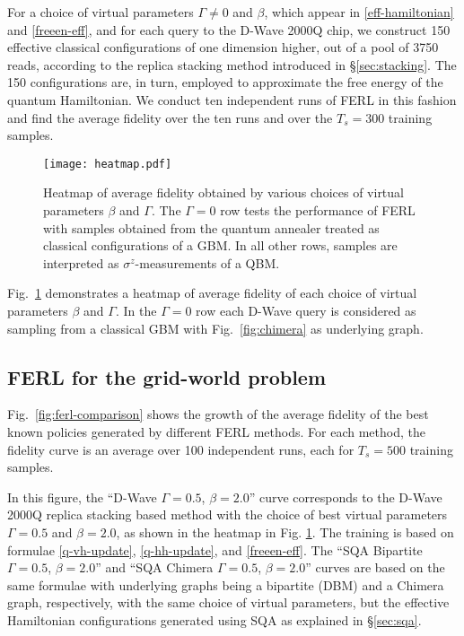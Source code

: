 \documentclass[pra,twocolumn,floatfix,superscriptaddress]{revtex4}
\begin{document}
For a choice of virtual parameters $\Gamma \neq 0$ and $\beta$, which appear in \eqref{eff-hamiltonian} and \eqref{freeen-eff}, and for each query to the D-Wave 2000Q chip, we construct 150 effective classical configurations of one dimension higher, out of a pool of 3750 reads, according to the replica stacking method introduced in \S\ref{sec:stacking}. The 150 configurations are, in turn, employed to approximate the free energy of the quantum Hamiltonian. 
We conduct ten independent runs of FERL in this fashion and find the average fidelity over the ten runs and over the $T_s= 300$ training samples. 
\begin{figure}
  \centering
     \texttt{[image: heatmap.pdf]}  
     \caption{\footnotesize{Heatmap of average fidelity obtained by various choices of virtual parameters $\beta$ and $\Gamma$. The $\Gamma = 0$ row tests the performance of FERL with samples obtained from the quantum annealer treated as classical configurations of a GBM. In all other rows, samples are interpreted as $\sigma^z$-measurements of a QBM.}}
  \label{fig:heatmap}
\end{figure}


Fig.~\ref{fig:heatmap} demonstrates a heatmap of average fidelity of each choice of virtual parameters $\beta$ and $\Gamma$. In the $\Gamma = 0$ row each D-Wave query is considered as sampling from a classical GBM with Fig.~\ref{fig:chimera} as underlying graph. 

\subsection{FERL for the grid-world problem} 

Fig.~\ref{fig:ferl-comparison} shows the growth of the average fidelity of the best known policies generated by different FERL methods. For each method, the fidelity curve is an average over 100 independent runs, each for $T_s= 500$ training samples. 

In this figure, the ``D-Wave $\Gamma = 0.5$, $\beta = 2.0$'' curve corresponds to the D-Wave 2000Q replica stacking based method with the choice of best virtual parameters $\Gamma= 0.5$ and $\beta= 2.0$, as shown in the heatmap in Fig. \ref{fig:heatmap}. The training is based on formulae \eqref{q-vh-update}, \eqref{q-hh-update}, and \eqref{freeen-eff}. 
The ``SQA Bipartite $\Gamma = 0.5$, $\beta = 2.0$''  and ``SQA Chimera $\Gamma = 0.5$, $\beta = 2.0$'' curves are based on the same formulae with underlying graphs being a bipartite (DBM) and a Chimera graph, respectively, with the same choice of virtual parameters, but the effective Hamiltonian configurations generated using SQA as explained in \S\ref{sec:sqa}. 
\end{document}
